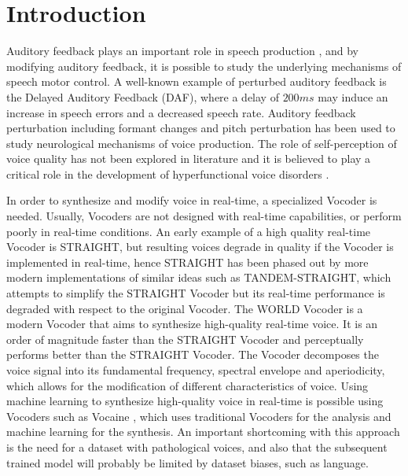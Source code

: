 \documentclass[final,5p,times,twocolumn]{elsarticle}
\begin{document}

\section{Introduction}

Auditory feedback plays an important role in speech production \cite{Elman1981}, and by modifying auditory feedback, it is possible to study the underlying mechanisms of speech motor control. A well-known example of perturbed auditory feedback is the Delayed Auditory Feedback (DAF), where a delay of $200 ms$ may induce an increase in speech errors and a decreased speech rate\cite{Chesters2015}. Auditory feedback perturbation including formant changes \cite{Tourville2008} and pitch perturbation \cite{Abur2021}\cite{Abur2020} has been used to study neurological mechanisms of voice production. The role of self-perception of voice quality has not been explored in literature and it is believed to play a critical role in the development of hyperfunctional voice disorders \cite{Galindo_2017}. 

In order to synthesize and modify voice in real-time, a specialized Vocoder is needed. Usually, Vocoders are not designed with real-time capabilities, or perform poorly in real-time conditions. An early example of a high quality real-time Vocoder is STRAIGHT\cite{Kawahara1999}, but resulting voices degrade in quality if the Vocoder is implemented in real-time, hence STRAIGHT has been phased out by more modern implementations of similar ideas such as TANDEM-STRAIGHT\cite{tandem2008}\cite{tandem2011}, which attempts to simplify the STRAIGHT Vocoder but its real-time performance is degraded with respect to the original Vocoder. The WORLD Vocoder\cite{Morise2016} is a modern Vocoder that aims to synthesize high-quality real-time voice. It is an order of magnitude faster than the STRAIGHT Vocoder and perceptually performs better than the STRAIGHT Vocoder. The Vocoder decomposes the voice signal into its fundamental frequency, spectral envelope and aperiodicity, which allows for the modification of different characteristics of voice. Using machine learning to synthesize high-quality voice in real-time is possible using Vocoders such as Vocaine \cite{vocaine}, which uses traditional Vocoders for the analysis and machine learning for the synthesis. An important shortcoming with this approach is the need for a dataset with pathological voices, and also that the subsequent trained model will probably be limited by dataset biases, such as language.
\end{document}
